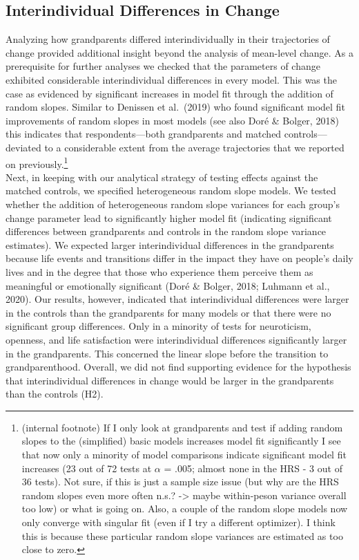 \documentclass[
  english,
  man, noextraspace]{apa7}
\begin{document}
\hypertarget{interindividual-differences-in-change-1}{%
\subsection{Interindividual Differences in Change}\label{interindividual-differences-in-change-1}}

Analyzing how grandparents differed interindividually in their trajectories of change provided additional insight beyond the analysis of mean-level change. As a prerequisite for further analyses we checked that the parameters of change exhibited considerable interindividual differences in every model. This was the case as evidenced by significant increases in model fit through the addition of random slopes. Similar to Denissen et al.~(2019) who found significant model fit improvements of random slopes in most models (see also Doré \& Bolger, 2018) this indicates that respondents---both grandparents and matched controls---deviated to a considerable extent from the average trajectories that we reported on previously.\footnote{(internal footnote) If I only look at grandparents and test if adding random slopes to the (simplified) basic models increases model fit significantly I see that now only a minority of model comparisons indicate significant model fit increases (23 out of 72 tests at \(\alpha\) = .005; almost none in the HRS - 3 out of 36 tests). Not sure, if this is just a sample size issue (but why are the HRS random slopes even more often n.s.? -\textgreater{} maybe within-peson variance overall too low) or what is going on. Also, a couple of the random slope models now only converge with singular fit (even if I try a different optimizer). I think this is because these particular random slope variances are estimated as too close to zero.}\\
Next, in keeping with our analytical strategy of testing effects against the matched controls, we specified heterogeneous random slope models. We tested whether the addition of heterogeneous random slope variances for each group's change parameter lead to significantly higher model fit (indicating significant differences between grandparents and controls in the random slope variance estimates). We expected larger interindividual differences in the grandparents because life events and transitions differ in the impact they have on people's daily lives and in the degree that those who experience them perceive them as meaningful or emotionally significant (Doré \& Bolger, 2018; Luhmann et al., 2020). Our results, however, indicated that interindividual differences were larger in the controls than the grandparents for many models or that there were no significant group differences. Only in a minority of tests for neuroticism, openness, and life satisfaction were interindividual differences significantly larger in the grandparents. This concerned the linear slope before the transition to grandparenthood. Overall, we did not find supporting evidence for the hypothesis that interindividual differences in change would be larger in the grandparents than the controls (H2).\\
\end{document}
